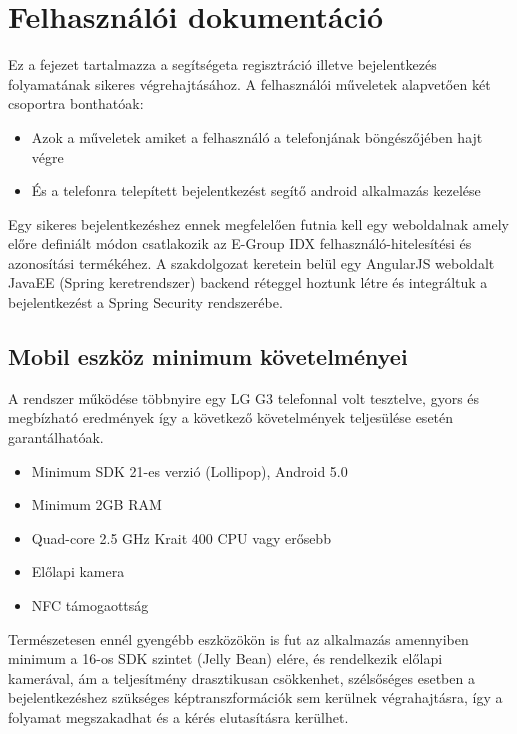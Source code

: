 \section{Felhasználói dokumentáció}
Ez a fejezet tartalmazza a segítségeta regisztráció illetve bejelentkezés folyamatának sikeres végrehajtásához. A felhasználói műveletek alapvetően két csoportra bonthatóak:
\begin{itemize}
\item Azok a műveletek amiket a felhasználó a telefonjának böngészőjében hajt végre
\item És a telefonra telepített bejelentkezést segítő android alkalmazás kezelése
\end{itemize}

Egy sikeres bejelentkezéshez ennek megfelelően futnia kell egy weboldalnak amely előre definiált módon csatlakozik az E-Group IDX felhasználó-hitelesítési és azonosítási termékéhez.
A szakdolgozat keretein belül egy AngularJS weboldalt JavaEE (Spring keretrendszer) backend réteggel hoztunk létre és integráltuk a bejelentkezést a Spring Security rendszerébe.

\subsection{Mobil eszköz minimum követelményei}
A rendszer működése többnyire egy LG G3 telefonnal volt tesztelve, gyors és megbízható eredmények így a következő követelmények teljesülése esetén garantálhatóak.
\begin{itemize}
\item Minimum SDK 21-es verzió (Lollipop), Android 5.0
\item Minimum 2GB RAM
\item Quad-core 2.5 GHz Krait 400 CPU vagy erősebb
\item Előlapi kamera
\item NFC támogaottság
\end{itemize}

Természetesen ennél gyengébb eszközökön is fut az alkalmazás amennyiben minimum a 16-os SDK szintet (Jelly Bean) elére, és rendelkezik előlapi kamerával, ám a teljesítmény drasztikusan csökkenhet, szélsőséges esetben a bejelentkezéshez szükséges képtranszformációk sem kerülnek végrahajtásra, így a folyamat megszakadhat és a kérés elutasításra kerülhet.


